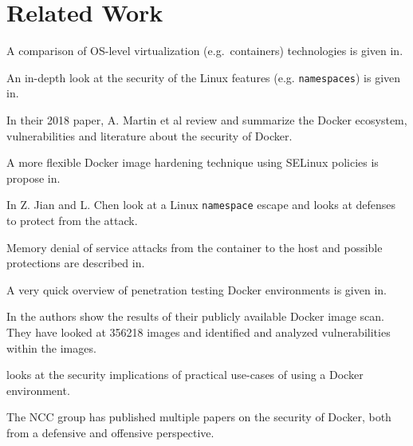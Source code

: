\chapter{Related Work}

A comparison of OS-level virtualization (e.g.\ containers) technologies is given in\cite{Security-OS-level-Virtualization}.

An in-depth look at the security of the Linux features (e.g. \lstinline{namespaces}) is given in\cite{Analysis-Docker-Security}.

In their 2018 paper, A. Martin et al review and summarize the Docker ecosystem, vulnerabilities and literature about the security of Docker\cite{Docker-Ecosystem-Vulnerability-Analysis}.

A more flexible Docker image hardening technique using SELinux policies is propose in\cite{DockerPolicyModules}.

In\cite{Defense-Docker-Escape} Z. Jian and L. Chen look at a Linux \lstinline{namespace} escape and looks at defenses to protect from the attack.

Memory denial of service attacks from the container to the host and possible protections are described in\cite{Securing-Docker-Containers-from-DOS}.

A very quick overview of penetration testing Docker environments is given in\cite{Research-Pentesting-Docker-Environment}.

In\cite{Study-Vulnerabilities-Docker-Hub} the authors show the results of their publicly available Docker image scan. They have looked at 356218 images and identified and analyzed vulnerabilities within the images.

\cite{To-Docker-Not-To-Docker} looks at the security implications of practical use-cases of using a Docker environment.

The NCC group has published multiple papers on the security of Docker, both from a defensive\cite{Understanding-and-Hardening-Linux-Containers} and offensive\cite{Abusing-Containers} perspective.
